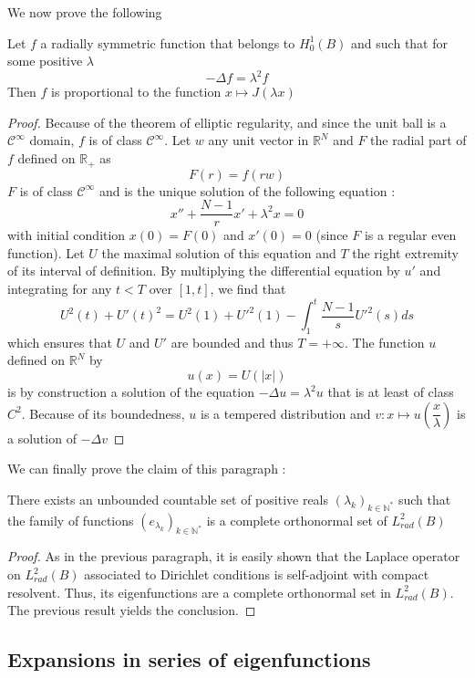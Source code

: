 \documentclass[11pt,a4paper]{article}
\begin{document}
We now prove the following 
\begin{Prop} Let $f$ a radially symmetric function that belongs to $H^1_0(B)$ and such that for some positive $\lambda$ 
\[-\Delta f = \lambda^2 f\]
Then $f$ is proportional to the function $x \mapsto J\left(\lambda x\right)$

\begin{proof}
Because of the theorem of elliptic regularity, and since the unit ball is a $\mathcal{C}^{\infty}$ domain, $f$ is of class $\mathcal{C}^{\infty}$. 
Let $w$ any unit vector in $\mathbb{R}^N$ and $F$ the radial part of $f$ defined on $\mathbb{R}_+$ as
\[F(r) = f(rw)\]
$F$ is of class $\mathcal{C}^{\infty}$ and is the unique solution of the following equation : \[ x'' + \dfrac{N-1}{r}x' + \lambda^2 x = 0\]
with initial condition $x(0) =  F(0)$ and $x'(0) = 0$ (since $F$ is a regular even function). Let $U$ the maximal solution of this equation and $T$ the right extremity of its interval of definition. By multiplying the differential equation by $u'$ and integrating for any $t < T$ over $[1,t]$, we find that 
\[ U^2(t) + U'(t)^2 = U^2(1) + U'^2(1) - \int_{1}^t \dfrac{N-1}{s}U'^2(s)ds \] which ensures that $U$ and $U'$ are bounded and thus $T = +\infty$. The function $u$ defined on $\mathbb{R}^N$ by 
\[u(x) = U(|x|)\] is by construction a solution of the equation $-\Delta u = \lambda^2 u$ that is at least of class $C^2$. Because of its boundedness, $u$ is a tempered distribution and $v : x \mapsto u\left(\dfrac{x}{\lambda}\right)$ is a solution of $- \Delta v $
\end{proof}
\end{Prop}

We can finally prove the claim of this paragraph : 

\begin{Prop} There exists an unbounded countable set of positive reals $(\lambda_k)_{k\in\mathbb{N^*}}$ such that the family of functions $(e_{\lambda_k})_{k\in\mathbb{N^*}}$ is a complete orthonormal set of $L^2_{rad}(B)$
\begin{proof}
As in the previous paragraph, it is easily shown that the Laplace operator on $L^2_{rad}(B)$ associated to Dirichlet conditions is self-adjoint with compact resolvent. Thus, its eigenfunctions are a complete orthonormal set in $L^2_{rad}(B)$. The previous result yields the conclusion. 
\end{proof}
\end{Prop}

\subsection{Expansions in series of eigenfunctions}
\end{document}
